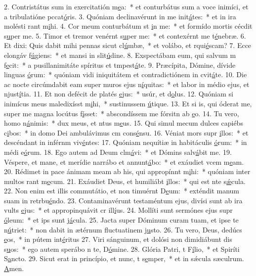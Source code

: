 2. Contristátus sum in exercitatión m\uline{e}a:~* et conturbátus sum a voce inimíci, et a tribulatióne pccat\uline{ó}ris.
3. Quóniam declinavérunt in me init\uline{á}tes:~* et in ira molésti rant m\uline{i}hi.
4. Cor meum conturbátum st \uline{i}n me:~* et formído mortis cécdit s\uline{u}per me.
5. Timor et tremor venérnt s\uline{u}per me:~* et contexérnt me t\uline{é}nebræ.
6. Et dixi: Quis dabit mihi pennas sicut cl\uline{ú}mbæ,~* et volábo, et rqui\uline{é}scam?
7. Ecce elongáv f\uline{ú}giens:~* et mansi in slit\uline{ú}dine.
8. Exspectábam eum, qui salvum m f\uline{e}cit:~* a pusillanimitáte spíritus et tmpest\uline{á}te.
9. Præcípita, Dómine, dívide linguas \uline{ó}rum:~* quóniam vidi iniquitátem et contradictiónem in cvit\uline{á}te.
10. Die ac nocte circúmdabit eam super muros ejus n\uline{í}quitas:~* et labor in médio ejus, et njust\uline{í}tia.
11. Et non defécit de platés \uline{e}jus:~* usúr, et d\uline{o}lus.
12. Quóniam si inimícus meus maledixísst m\uline{i}hi,~* sustinussem \uline{ú}tique.
13. Et si is, qui óderat me, super me magna locútus f\uline{í}sset:~* abscondíssem me fórsitn ab \uline{e}o.
14. Tu vero, homo n\uline{á}nimis:~* dux meus, et ntus m\uline{e}us.
15. Qui simul mecum dulces capiébs c\uline{i}bos:~* in domo Dei ambulávimus cm cons\uline{é}nsu.
16. Véniat mors supr \uline{i}llos:~* et descéndant in inférnm viv\uline{é}ntes:
17. Quóniam nequítiæ in habitáculis \uline{ó}rum:~* in médi e\uline{ó}rum.
18. Ego autem ad Deum clm\uline{á}vi:~* et Dómins salv\uline{á}bit me.
19. Véspere, et mane, et merídie narrábo et annunt\uline{á}bo:~* et exáudiet vcem m\uline{e}am.
20. Rédimet in pace ánimam meam ab his, qui appropínnt m\uline{i}hi:~* quóniam inter multos rant m\uline{e}cum.
21. Exáudiet Deus, et humiliábt \uline{i}llos:~* qui est nte s\uline{ǽ}cula.
22. Non enim est illis commutátio, et non timuérnt D\uline{e}um:~* exténdit manum suam in retrbu\uline{é}ndo.
23. Contaminavérunt testaméntum ejus, divísi sunt ab ira vults \uline{e}jus:~* et appropinquávit cr ill\uline{í}us.
24. Mollíti sunt sermónes ejus supr \uline{ó}leum:~* et ips sunt j\uline{á}cula.
25. Jacta super Dóminum curam tuam, et ipse te n\uline{ú}triet:~* non dabit in ætérnum fluctuatinem j\uline{u}sto.
26. Tu vero, Deus, dedúcs \uline{e}os,~* in pútem int\uline{é}ritus
27. Viri sánguinum, et dolósi non dimidiábunt dis s\uline{u}os:~* ego autem sperábo n te, D\uline{ó}mine.
28. Glória Patri, t F\uline{í}lio,~* et Spiríti S\uline{a}ncto.
29. Sicut erat in princípio, et nunc, t s\uline{e}mper,~* et in sǽcula sæculrum. \uline{A}men.
